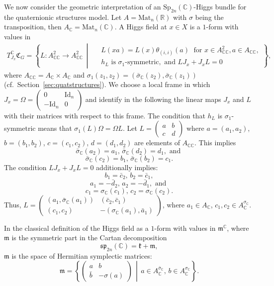 \documentclass[oneside,11pt]{amsart}
\theoremstyle{definition}
\theoremstyle{remark}
\newcommand{\midwd}{\,\middle\vert\,}
\numberwithin{thm}{section}
\numberwithin{equation}{section}
\begin{document}
We now consider the geometric interpretation of an $\mathrm{Sp}_{2n}( \mathbb{C})$-Higgs bundle for the quaternionic structures model. Let $A=\mathrm{Mat}_n(\mathbb R)$ with $\sigma$ being the transposition, then $A_\mathbb C=\mathrm{Mat}_n(\mathbb C)$. A Higgs field at $x\in X$ is a $1$-form with values in
\begin{align*}
T^\mathbb C_{J_x}\mathfrak{C}_G=\left\{
L\colon A_{\mathbb{C}\mathbb C}^2\to A_{\mathbb{C}\mathbb C}^2 \midwd
\begin{aligned}
    &\ L(xa)=L(x)\theta_{(i,i)}(a)\;\text{ for }x\in A_{\mathbb{C}\mathbb C}^2, a\in A_{\mathbb{C}\mathbb C},\\
    &\ h_L \text{ is } \sigma_1\text{-symmetric}, \text{ and } LJ_x+J_xL=0
\end{aligned}
\right\},
\end{align*}
where $A_{\mathbb C\mathbb C}=A_{\mathbb C}\times A_{\mathbb C}$ and $\sigma_1(z_1,z_2)=(\bar\sigma_\mathbb C(z_2),\bar\sigma_\mathbb C(z_1))$ (cf.~Section~\ref{sec:quatstructures}). We choose a local frame in which $J_x=\Omega=\begin{pmatrix}
0 & \mathrm{Id}_n\\
-\mathrm{Id}_n & 0 
\end{pmatrix}$ and identify in the following the linear maps $J_x$ and $L$ with their matrices with respect to this frame.
The condition that $h_L$ is  $\sigma_1$-symmetric means that $\sigma_1(L)\Omega=\Omega L$. Let $L=\begin{pmatrix}
a & b \\
c & d
\end{pmatrix}$ where $a=(a_1,a_2)$, $b=(b_1,b_2)$, $c=(c_1,c_2)$, $d=(d_1,d_2)$ are elements of $A_{\mathbb C\mathbb C}$. This implies 
$$\bar\sigma_\mathbb C(a_2)=a_1,\,\bar\sigma_\mathbb C(d_2)=d_1, \text{ and }$$ 
$$\bar\sigma_\mathbb C(c_2)=b_1,\,\bar\sigma_\mathbb C(b_2)=c_1.$$
The condition $LJ_x+J_xL=0$ additionally implies:
$$b_1=\bar c_2,\, b_2=\bar c_1,$$
$$a_1=-\bar d_2,\, a_2=-\bar d_1, \text{ and }$$
$$c_1=\sigma_\mathbb C(c_1),\,c_2=\sigma_\mathbb C(c_2).$$
Thus, $L=\begin{pmatrix}
(a_1,\bar\sigma_\mathbb C(a_1)) & (\bar c_2,\bar c_1)\\
(c_1,c_2) & -(\sigma_\mathbb C(a_1),\bar a_1)
\end{pmatrix}$, where $a_1\in A_\mathbb C$, $c_1,c_2\in A_\mathbb C^{\sigma_\mathbb C}$.

In the classical definition of the Higgs field as a $1$-form with values in $\mathfrak m^\mathbb C$, where $\mathfrak m$ is the symmetric part in the Cartan decomposition
$$\mathfrak{sp}_{2n}(\mathbb C)=\mathfrak{k}+\mathfrak m,$$
 $\mathfrak m$ is the space of Hermitian symplectic matrices: 
$$\mathfrak m=\left\{\begin{pmatrix}
a & b \\
\bar b & -\sigma(a)
\end{pmatrix} \midwd a\in A_\mathbb C^{\bar\sigma_\mathbb C},\,b\in A_\mathbb C^{\sigma_\mathbb C}\right\}.$$
\end{document}
